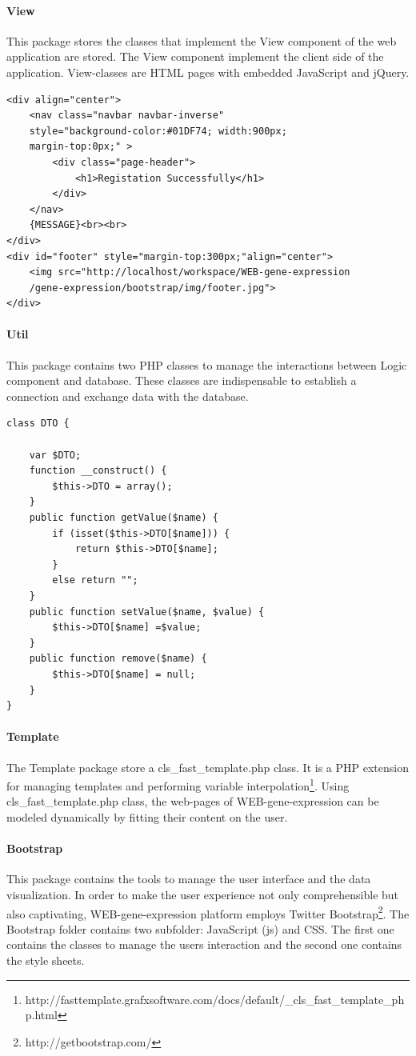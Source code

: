 \documentclass[a4paper]{report}
\begin{document}
\paragraph{View} This package stores the classes that implement the View component of the web application  are stored. The View component implement the client side of the application. View-classes are HTML pages with embedded JavaScript and jQuery.
\begin{lstlisting}[title={login.html's body.},frame=trBL]	
<div align="center">
	<nav class="navbar navbar-inverse"
	style="background-color:#01DF74; width:900px;
	margin-top:0px;" >
  		<div class="page-header">
  			<h1>Registation Successfully</h1>
		</div>
	</nav>
	{MESSAGE}<br><br>
</div>
<div id="footer" style="margin-top:300px;"align="center">
	<img src="http://localhost/workspace/WEB-gene-expression
	/gene-expression/bootstrap/img/footer.jpg">
</div>
\end{lstlisting}

\paragraph{Util} This package contains two PHP classes to manage the interactions between Logic component and database. These classes are indispensable to establish a connection and exchange data with the database.
\begin{lstlisting}[title={DTO.php class.},frame=trBL]	
class DTO {

	var $DTO;
	function __construct() {
		$this->DTO = array();
	}
	public function getValue($name) {
		if (isset($this->DTO[$name])) {
			return $this->DTO[$name];
		}
		else return "";
	}
	public function setValue($name, $value) {
		$this->DTO[$name] =$value;
	}
	public function remove($name) {
		$this->DTO[$name] = null;
	}
}
\end{lstlisting}

\paragraph{Template} The Template package store a cls\_fast\_template.php class. It is a PHP extension for managing templates and performing variable interpolation\footnote{http://fasttemplate.grafxsoftware.com/docs/default/\_cls\_fast\_template\_php.html}.
Using cls\_fast\_template.php class, the web-pages of WEB-gene-expression can be modeled dynamically by fitting their content on the user.

\paragraph{Bootstrap} This package contains the tools to manage the user interface and the data visualization. In order to make the user experience not only comprehensible but also captivating, WEB-gene-expression platform employs Twitter Bootstrap\footnote{http://getbootstrap.com/}. The Bootstrap folder contains two subfolder: JavaScript (js) and CSS. The first one contains the classes to manage the users interaction and the second one contains the style sheets. 
\end{document}
